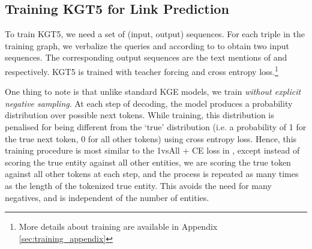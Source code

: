 \documentclass[11pt]{article}
\renewcommand\:{\colon} \newcommand{\sset}[1]{\left\{\,#1\,\right\}} \newcommand{\ssets}[1]{\left\{#1\right\}} \newcommand{\ssetn}[1]{\{\,#1\,\}}
\newcommand{\method}{\textsc{KGT5}}
\begin{document}
\subsection{Training \method{} for Link Prediction}
\label{sec:training}
To train KGT5, we need a set of (input, output) sequences. For each triple  in the training graph, we verbalize the queries  and  according to  to obtain two input sequences. The corresponding output sequences are the text mentions of  and  respectively. KGT5 is trained with teacher forcing \cite{teacher_forcing} and cross entropy loss.\footnote{More details about training are available in Appendix \ref{sec:training_appendix}}

One thing to note is that unlike standard KGE models, we train \textit{without explicit negative sampling}. 
At each step of decoding, the model produces a probability distribution over possible next tokens. While training, this distribution is penalised for being different from the `true' distribution (i.e. a probability of 1 for the true next token, 0 for all other tokens) using cross entropy loss. Hence, this training procedure is most similar to the 1vsAll + CE loss in \citet{ruffinelli2020you}, except instead of scoring the true entity against all other entities, we are scoring the true token against all other tokens at each step, and the process is repeated as many times as the length of the tokenized true entity. This avoids the need for many negatives, and is independent of the number of entities.








\begin{table}[]
\centering
{}
\caption{Statistics of the KGs used.~We use subsets of FreeBase~\cite{freebase:datadumps}  for WebQuestionsSP (WQSP) and ComplexWebQuestions (CWQ).
}
\label{tab:kg-stats}
\end{table} 
\end{document}
